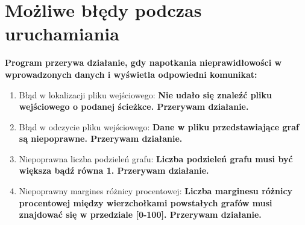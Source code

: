 \documentclass{article}
\begin{document}
\section*{Możliwe błędy podczas uruchamiania}
\textbf{Program przerywa działanie, gdy napotkania nieprawidłowości w wprowadzonych danych i wyświetla odpowiedni komunikat:}

\begin{enumerate}
  \item Błąd w lokalizacji pliku wejściowego: \textbf{Nie udało się znaleźć pliku wejściowego o podanej ścieżkce. Przerywam działanie.}

  \item Błąd w odczycie pliku wejściowego: \textbf{Dane w pliku przedstawiające graf są niepoprawne. Przerywam działanie.}
  
  \item Niepoprawna liczba podzieleń grafu: \textbf{Liczba podzieleń grafu musi być większa bądź równa 1. Przerywam działanie.}
  
  \item Niepoprawny margines różnicy procentowej: \textbf{Liczba marginesu różnicy procentowej między wierzchołkami powstałych grafów musi znajdować się w przedziale [0-100]. Przerywam działanie.}
  
\end{enumerate}
\end{document}
